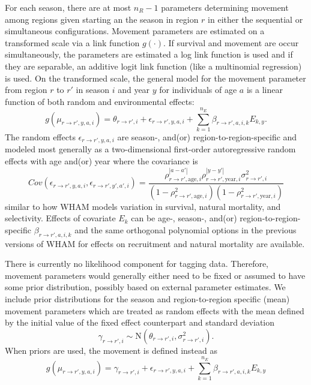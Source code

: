 \documentclass[
]{article}
\begin{document}
For each season, there are at most \(n_R-1\) parameters determining
movement among regions given starting an the season in region \(r\) in
either the sequential or simultaneous configurations. Movement
parameters are estimated on a transformed scale via a link function
\(g(\cdot)\). If survival and movement are occur simultaneously, the
parameters are estimated a log link function is used and if they are
separable, an additive logit link function (like a multinomial
regression) is used. On the transformed scale, the general model for the
movement parameter from region \(r\) to \(r'\) in season \(i\) and year
\(y\) for individuals of age \(a\) is a linear function of both random
and environmental effects: \begin{equation*}
  g(\mu_{r\rightarrow r',y,a,i}) = \theta_{r\rightarrow r',i} + \epsilon_{r\rightarrow r',y,a,i} + \sum^{n_E}_{k=1} \beta_{r \rightarrow r',a,i,k} E_{k,y}.
\end{equation*} The random effects \(\epsilon_{r\rightarrow r',y,a,i}\)
are season-, and(or) region-to-region-specific and modeled most
generally as a two-dimensional first-order autoregressive random effects
with age and(or) year where the covariance is \begin{equation*}
  Cov\left(\epsilon_{r\rightarrow r',y,a,i},\epsilon_{r\rightarrow r',y',a',i}\right) =   \frac{\rho_{r\rightarrow r',\text{age},i}^{|a-a'|}\rho_{r\rightarrow r',\text{year},i}^{|y-y'|}\sigma^2_{r\rightarrow r',i}}{\left(1 -  \rho_{r\rightarrow r',\text{age},i}^2\right)\left(1 - \rho_{r\rightarrow r',\text{year},i}^2\right)}
\end{equation*} similar to how WHAM models variation in survival,
natural mortality, and selectivity. Effects of covariate \(E_k\) can be
age-, season-, and(or) region-to-region-specific
\(\beta_{r\rightarrow r',a,i,k}\) and the same orthogonal polynomial
options in the previous versions of WHAM for effects on recruitment and
natural mortality are available.

There is currently no likelihood component for tagging data. Therefore,
movement parameters would generally either need to be fixed or assumed
to have some prior distribution, possibly based on external parameter
estimates. We include prior distributions for the season and
region-to-region specific (mean) movement parameters which are treated
as random effects with the mean defined by the initial value of the
fixed effect counterpart and standard deviation \begin{equation*}
  \gamma_{r\rightarrow r',i} \sim \text{N}\left(\theta_{r\rightarrow r',i}, \sigma^2_{r\rightarrow r',i}\right).
  \end{equation*} When priors are used, the movement is defined instead
as \begin{equation*}
  g(\mu_{r\rightarrow r',y,a,i}) = \gamma_{r\rightarrow r',i} + \epsilon_{r\rightarrow r',y,a,i} + \sum^{n_E}_{k=1} \beta_{r\rightarrow r',a,i,k} E_{k,y} 
  \end{equation*}
\end{document}
